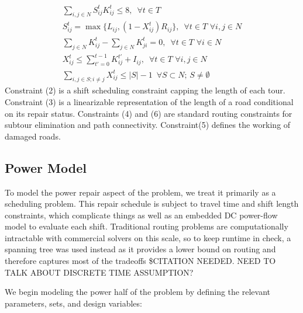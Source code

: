 \documentclass[10pt]{article}
\begin{document}
	\begin{eqnarray}
	\sum_{i,j \in N} S_{ij}^t K_{ij}^t \leq 8, \hspace{6pt} \forall t\in T \\
	S_{ij}^t = \max \{L_{ij}, (1-X_{ij}^t)R_{ij} \}, \hspace{6pt} \forall t\in T \hspace{4pt} \forall i,j \in N\\
	\sum_{j \in N} K_{ij}^t - \sum_{j \in N} K_{ji}^t = 0, \hspace{6pt} \forall t\in T \hspace{4pt} \forall i \in N\\
	X_{ij}^t \le \sum_{t'=0}^{t-1} K_{ij}^{t'} + I_{ij}, \hspace{6pt} \forall t\in T \hspace{4pt} \forall i,j \in N\\
	\sum_{i,j \in S; i\neq j} X_{ij}^t \leq |S|-1 \hspace{6pt} \forall S \subset N; \hspace{2pt} S \neq \emptyset
	\end{eqnarray}
Constraint (2) is a shift scheduling constraint capping the length of each tour. Constraint (3) is a linearizable representation of the length of a road conditional on its repair status. Constraints (4) and (6) are standard routing constraints for subtour elimination and path connectivity. Constraint(5) defines the working of damaged roads.


\subsection{Power Model}
\vspace*{-12pt}
To model the power repair aspect of the problem, we treat it primarily as a scheduling problem. This repair schedule is subject to travel time and shift length constraints, which complicate things as well as an embedded DC power-flow model to evaluate each shift. Traditional routing problems are computationally intractable with commercial solvers on this scale, so to keep runtime in check, a spanning tree was used instead as it provides a lower bound on routing and therefore captures most of the tradeoffs \$CITATION NEEDED. NEED TO TALK ABOUT DISCRETE TIME ASSUMPTION?

We begin modeling the power half of the problem by defining the relevant parameters, sets, and design variables:
\end{document}
